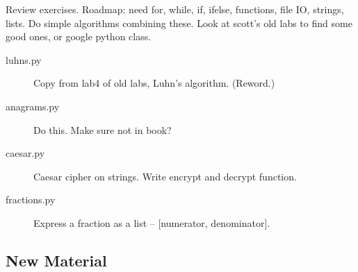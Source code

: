 \documentclass[11pt]{cselabheader}
\begin{document}
Review exercises. Roadmap: need for, while, if, ifelse,
functions, file IO, strings, lists. Do simple algorithms combining these.
Look at scott's old labs to find some good ones, or google python class.


\begin{description}
  \item[luhns.py] Copy from lab4 of old labs, Luhn's algorithm. (Reword.)

  \item[anagrams.py] Do this. Make sure not in book?

  \item[caesar.py] Caesar cipher on strings. Write encrypt and decrypt function.

  \item[fractions.py] Express a fraction as a list -- [numerator, denominator].
\end{description}

\subsection{New Material}
\end{document}
